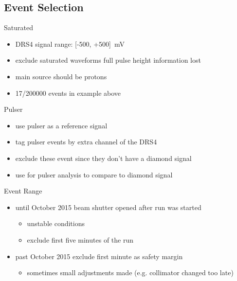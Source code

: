 \subsection{Event Selection}
\begin{frame}{Saturated}


	\begin{itemize}\itemfill
		\item DRS4 signal range: [-500, +500]\, mV
		\item exclude saturated waveforms \ra full pulse height information lost
		\item main source should be protons
		\item 17/200000 events in example above
	\end{itemize}
	
\end{frame}
\begin{frame}{Pulser}


	\begin{itemize}\itemfill
		\item<1-> use pulser as a reference signal
		\item<1-> tag pulser events by extra channel of the DRS4
		\item<2-> exclude these event since they don't have a diamond signal
		\item<2-> use for pulser analysis to compare to diamond signal
	\end{itemize}
	
\end{frame}
\begin{frame}{Event Range}
	
	\vspace*{-10pt}

	\begin{itemize}\itemfill
		\item until October 2015 \ra beam shutter opened after run was started
		\begin{itemize}
			\item unstable conditions
			\item exclude first five minutes of the run\vspace*{5pt}
		\end{itemize}
		\item past October 2015 exclude first minute as safety margin
		\begin{itemize}
			\item sometimes small adjustments made (e.g. collimator changed too late)
		\end{itemize}

	\end{itemize}
	
\end{frame}
